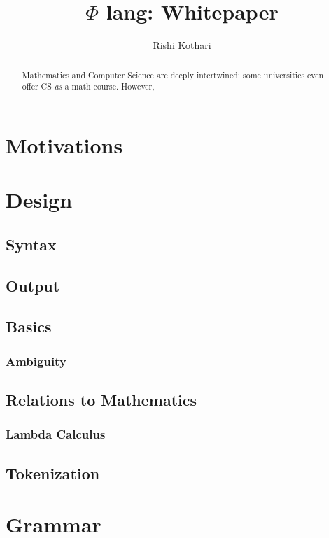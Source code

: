 \documentclass[11pt, oneside]{article}
\title{$\Phi$ lang: Whitepaper}
\author{Rishi Kothari}
\date{}
\begin{document}
\maketitle

\newpage

\tableofcontents
\newpage
{}
\begin{abstract}
	Mathematics and Computer Science are deeply intertwined; some universities even offer CS \textit{as} a math course. However, 
\end{abstract}

\section{Motivations}


\section{Design}

\subsection{Syntax}


\subsection{Output}


\subsection{Basics}


\subsubsection{Ambiguity}


\subsection{Relations to Mathematics}

\subsubsection{Lambda Calculus}

\subsection{Tokenization}

\section{Grammar}

\subsection{}
\end{document}
